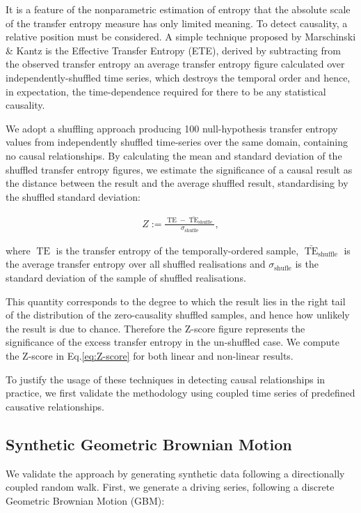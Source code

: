 \documentclass[]{rsos}%
\begin{document}
  
  It is a feature of the nonparametric estimation of entropy that the absolute scale of the transfer entropy measure has only limited meaning. To detect causality, a relative position must be considered. A simple technique proposed by Marschinski \& Kantz \cite{Marschinski2002} is the Effective Transfer Entropy (ETE), derived by subtracting from the observed transfer entropy an average transfer entropy figure calculated over independently-shuffled time series, which destroys the temporal order and hence, in expectation, the time-dependence required for there to be any statistical causality.

  We adopt a shuffling approach producing 100 null-hypothesis transfer entropy values from independently shuffled time-series over the same domain, containing no causal relationships. By calculating the mean and standard deviation of the shuffled transfer entropy figures, we estimate the significance of a causal result as the distance between the result and the average shuffled result, standardising by the shuffled standard deviation:
  
  \begin{eqnarray}
    \label{eq:Z-score}
    Z := \frac{\operatorname{TE} - \bar{\operatorname{TE}}_{\operatorname{shuffle}}}
              {\sigma_{\operatorname{shuffle}}} ,
  \end{eqnarray}
  
  where $\operatorname{TE}$ is the transfer entropy of the temporally-ordered sample, $\bar{\operatorname{TE}}_{\operatorname{shuffle}}$ is the average transfer entropy over all shuffled realisations and $\sigma_{\operatorname{shufle}} $ is the standard deviation of the sample of shuffled realisations.
  
  This quantity corresponds to the degree to which the result lies in the right tail of the distribution of the zero-causality shuffled samples, and hence how unlikely the result is due to chance. Therefore the Z-score figure represents the significance of the excess transfer entropy in the un-shuffled case. We compute the Z-score in Eq.\ref{eq:Z-score} for both linear and non-linear results.


  To justify the usage of these techniques in detecting causal relationships in practice, we first validate the methodology using coupled time series of predefined causative relationships. 


  \subsection{Synthetic Geometric Brownian Motion}\label{s.LinearSignal}
  We validate the approach by generating synthetic data following a directionally coupled random walk. First, we generate a driving series, following a discrete Geometric Brownian Motion (GBM):
\end{document}

